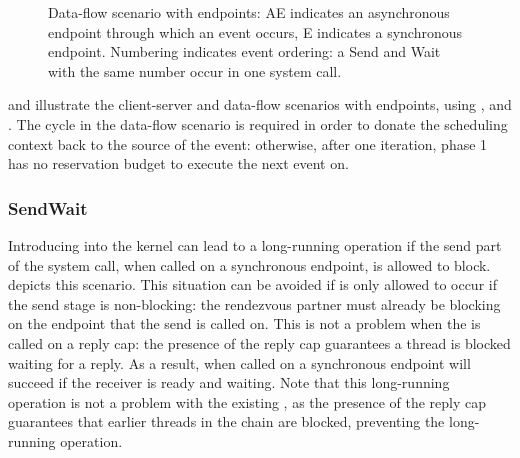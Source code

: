 \begin{figure}
\centering
\caption{Data-flow scenario with endpoints: AE indicates an asynchronous endpoint through which an event occurs, E indicates a synchronous endpoint. Numbering indicates event ordering: a Send and Wait with the same number occur in one system call.}
\label{fig:dataflow-endpoint}
\end{figure}

 and  illustrate the client-server and data-flow scenarios with endpoints, using \call, \replywait and \sendwait.
The cycle in the data-flow scenario is required in order to donate the scheduling context back to the source of the event: otherwise, after one iteration, phase 1 has no reservation budget to execute the next event on.

\subsubsection{SendWait}

Introducing \sendwait into the kernel can lead to a long-running operation if the send part of the system call, when called on a synchronous endpoint, is allowed to block.
 depicts this scenario.
This situation can be avoided if \sendwait is only allowed to occur if the send stage is non-blocking: the rendezvous partner must already be blocking on the endpoint that the send is called on.
This is not a problem when the \sendwait is called on a reply cap: the presence of the reply cap guarantees a thread is blocked waiting for a reply.
As a result, \sendwait when called on a synchronous endpoint will succeed if the receiver is ready and waiting.
Note that this long-running operation is not a problem with the existing \call, as the presence of the reply cap guarantees that earlier threads in the chain are blocked, preventing the long-running operation.


